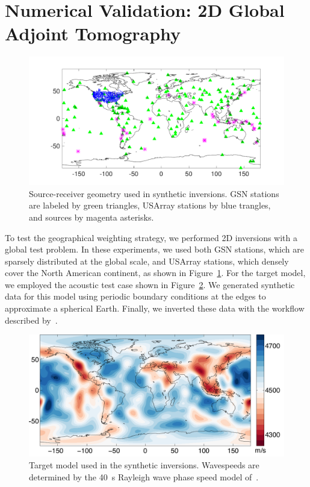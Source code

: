 \section{Numerical Validation: 2D Global Adjoint Tomography}

\begin{figure}
    \centering
    \begin{minipage}[t]{.9\columnwidth}
    \includegraphics[width=.95\textwidth]{ch-weighting/figures/network.pdf}  %
    \end{minipage}
\caption{\small{Source-receiver geometry used in synthetic inversions.  
GSN stations are labeled by green triangles, USArray stations by blue trangles, and sources 
by magenta asterisks.
}}
\label{fig:test-src-sta}
\end{figure}

To test the geographical weighting strategy, 
we performed 2D inversions with a global test problem.  In these experiments, we used both GSN stations, which are sparsely distributed 
at the global scale, and USArray stations, which densely cover the North American continent, as shown in Figure~\ref{fig:test-src-sta}.
For the target model, we employed the acoustic test case  shown in Figure~\ref{fig:test-model}.  We generated synthetic data for this model using periodic boundary 
conditions at the edges to approximate a spherical Earth.  Finally, we inverted these data  with the workflow described by~\cite{Modrak2018}.  

\begin{figure}
    \centering
    \begin{minipage}[t]{.9\columnwidth}
    \includegraphics[width=.9\textwidth]{ch-weighting/figures/2Dmodel.pdf}  %
    \end{minipage}
\caption{\small{Target model used in the synthetic inversions. Wavespeeds are determined by the 40~s Rayleigh wave phase speed model of~\cite{Trampert2003}.
}}
\label{fig:test-model}
\end{figure}
 
